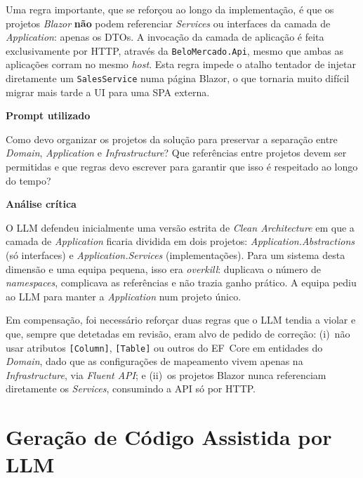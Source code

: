     Uma regra importante, que se reforçou ao longo da implementação, é que os projetos \textit{Blazor} \textbf{não} podem referenciar \textit{Services} ou interfaces da camada de \textit{Application}: apenas os DTOs. A invocação da camada de aplicação é feita exclusivamente por HTTP, através da \texttt{BeloMercado.Api}, mesmo que ambas as aplicações corram no mesmo \textit{host}. Esta regra impede o atalho tentador de injetar diretamente um \texttt{SalesService} numa página Blazor, o que tornaria muito difícil migrar mais tarde a UI para uma SPA externa.

    \begin{tcolorbox}[title=Interação com o LLM]
    \textbf{Prompt utilizado}

    Como devo organizar os projetos da solução para preservar a separação entre \textit{Domain}, \textit{Application} e \textit{Infrastructure}? Que referências entre projetos devem ser permitidas e que regras devo escrever para garantir que isso é respeitado ao longo do tempo?

    \tcblower

    \textbf{Análise crítica}

    O LLM defendeu inicialmente uma versão estrita de \textit{Clean Architecture} em que a camada de \textit{Application} ficaria dividida em dois projetos: \textit{Application.Abstractions} (só interfaces) e \textit{Application.Services} (implementações). Para um sistema desta dimensão e uma equipa pequena, isso era \textit{overkill}: duplicava o número de \textit{namespaces}, complicava as referências e não trazia ganho prático. A equipa pediu ao LLM para manter a \textit{Application} num projeto único.

    Em compensação, foi necessário reforçar duas regras que o LLM tendia a violar e que, sempre que detetadas em revisão, eram alvo de pedido de correção: (i)~não usar atributos \texttt{[Column]}, \texttt{[Table]} ou outros do EF~Core em entidades do \textit{Domain}, dado que as configurações de mapeamento vivem apenas na \textit{Infrastructure}, via \textit{Fluent API}; e (ii)~os projetos Blazor nunca referenciam diretamente os \textit{Services}, consumindo a API só por HTTP.
    \end{tcolorbox}

\section{Geração de Código Assistida por LLM}

